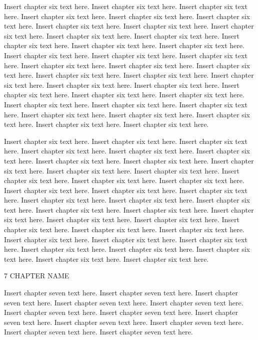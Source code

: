 Insert chapter six text here. Insert chapter six text here. Insert chapter six text here. Insert chapter six text here. Insert chapter six text here. Insert chapter six text here. Insert chapter six text here. Insert chapter six text here. Insert chapter six text here. Insert chapter six text here. Insert chapter six text here. Insert chapter six text here. Insert chapter six text here. Insert chapter six text here. Insert chapter six text here. Insert chapter six text here. Insert chapter six text here. Insert chapter six text here. Insert chapter six text here. Insert chapter six text here. Insert chapter six text here. Insert chapter six text here. Insert chapter six text here. Insert chapter six text here. Insert chapter six text here. Insert chapter six text here. Insert chapter six text here. Insert chapter six text here. Insert chapter six text here. Insert chapter six text here. Insert chapter six text here. Insert chapter six text here. Insert chapter six text here. Insert chapter six text here. Insert chapter six text here. Insert chapter six text here.

Insert chapter six text here. Insert chapter six text here. Insert chapter six text here. Insert chapter six text here. Insert chapter six text here. Insert chapter six text here. Insert chapter six text here. Insert chapter six text here. Insert chapter six text here. Insert chapter six text here. Insert chapter six text here. Insert chapter six text here. Insert chapter six text here. Insert chapter six text here. Insert chapter six text here. Insert chapter six text here. Insert chapter six text here. Insert chapter six text here. Insert chapter six text here. Insert chapter six text here. Insert chapter six text here. Insert chapter six text here. Insert chapter six text here. Insert chapter six text here. Insert chapter six text here. Insert chapter six text here. Insert chapter six text here. Insert chapter six text here. Insert chapter six text here. Insert chapter six text here. Insert chapter six text here. Insert chapter six text here. Insert chapter six text here. Insert chapter six text here. Insert chapter six text here. Insert chapter six text here.

7 CHAPTER NAME

Insert chapter seven text here. Insert chapter seven text here. Insert chapter seven text here. Insert chapter seven text here. Insert chapter seven text here. Insert chapter seven text here. Insert chapter seven text here. Insert chapter seven text here. Insert chapter seven text here. Insert chapter seven text here. Insert chapter seven text here. Insert chapter seven text here.

